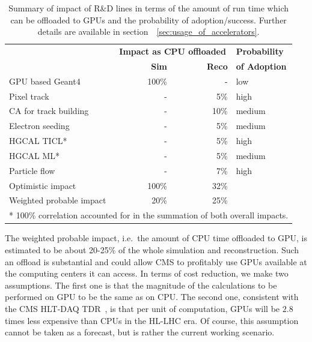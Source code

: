 \documentclass{cmspaper}
\newcommand{\trh}{\cellcolor{tablerowheader}}
\newcommand{\trl}{\cellcolor{tablerowhighlight}}
\newcommand{\B}[1]{\textbf{#1}}
\begin{document}
\begin{table}[ht]
\begin{center}
\caption{Summary of impact of R\&D lines in terms of the amount of run time which can be offloaded to GPUs and the probability of adoption/success. Further details are available in section~~\ref{sec:usage_of_accelerators}.}
\label{tab:summary-gpus}
\begin{tabular}{lrrl} 
\hline
\rowcolor{tableheader}                                         & \multicolumn{2}{c}{\B{Impact as CPU offloaded}} & \B{Probability} \\
\rowcolor{tableheader} \multirow{-2}{*}{\B{Short description}} & \B{Sim} & \B{Reco}                & \B{of Adoption} \\
\hline \hline
\trh GPU based Geant4             & 100\%   & -                                 & low    \\
\trh Pixel track                  & -       & 5\%                               & high   \\
\trh CA for track building        & -       & 10\%                              & medium \\
\trh Electron seeding             & -       & 5\%                               & medium \\
\trh HGCAL TICL*                  & -       & 5\%                               & high   \\
\trh HGCAL ML*                    & -       & 5\%                               & medium \\
\trh Particle flow                & -       & 7\%                               & high   \\ \hline
\trh Optimistic impact            & \trl 100\%   & \trl 32\%                    &        \\
\trh Weighted probable impact     & \trl 20\%    & \trl 25\%                    &        \\ \cline{1-3}
\multicolumn{4}{l}{\footnotesize{* 100\% correlation accounted for in the summation of both overall impacts.}} 
\end{tabular}
\end{center}
\end{table}

The weighted probable impact, i.e.~the amount of CPU time offloaded to GPU, is estimated to be about 20-25\% of the whole simulation and reconstruction. Such an offload is substantial and could allow CMS to profitably use GPUs available at the computing centers it can access. In terms of cost reduction, we make two assumptions. The first one is that the magnitude of the calculations to be performed on GPU to be the same as on CPU. The second one, consistent with the CMS HLT-DAQ TDR~\cite{CMS-TDR-21-007}, is that per unit of computation, GPUs will be $2.8$ times less expensive than CPUs in the HL-LHC era. Of course, this assumption cannot be taken as a forecast, but is rather the current working scenario. 
\end{document}
